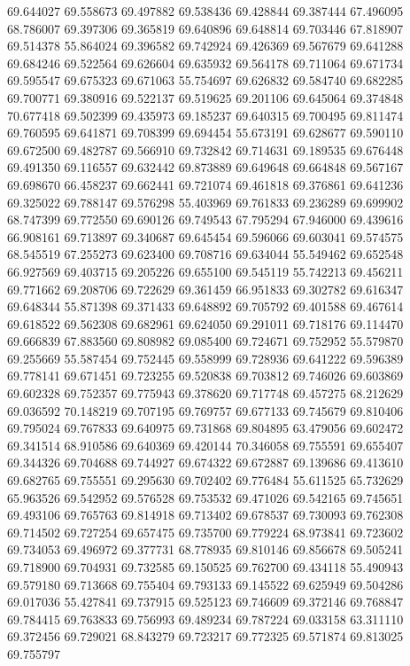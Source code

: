 69.644027
69.558673
69.497882
69.538436
69.428844
69.387444
67.496095
68.786007
69.397306
69.365819
69.640896
69.648814
69.703446
67.818907
69.514378
55.864024
69.396582
69.742924
69.426369
69.567679
69.641288
69.684246
69.522564
69.626604
69.635932
69.564178
69.711064
69.671734
69.595547
69.675323
69.671063
55.754697
69.626832
69.584740
69.682285
69.700771
69.380916
69.522137
69.519625
69.201106
69.645064
69.374848
70.677418
69.502399
69.435973
69.185237
69.640315
69.700495
69.811474
69.760595
69.641871
69.708399
69.694454
55.673191
69.628677
69.590110
69.672500
69.482787
69.566910
69.732842
69.714631
69.189535
69.676448
69.491350
69.116557
69.632442
69.873889
69.649648
69.664848
69.567167
69.698670
66.458237
69.662441
69.721074
69.461818
69.376861
69.641236
69.325022
69.788147
69.576298
55.403969
69.761833
69.236289
69.699902
68.747399
69.772550
69.690126
69.749543
67.795294
67.946000
69.439616
66.908161
69.713897
69.340687
69.645454
69.596066
69.603041
69.574575
68.545519
67.255273
69.623400
69.708716
69.634044
55.549462
69.652548
66.927569
69.403715
69.205226
69.655100
69.545119
55.742213
69.456211
69.771662
69.208706
69.722629
69.361459
66.951833
69.302782
69.616347
69.648344
55.871398
69.371433
69.648892
69.705792
69.401588
69.467614
69.618522
69.562308
69.682961
69.624050
69.291011
69.718176
69.114470
69.666839
67.883560
69.808982
69.085400
69.724671
69.752952
55.579870
69.255669
55.587454
69.752445
69.558999
69.728936
69.641222
69.596389
69.778141
69.671451
69.723255
69.520838
69.703812
69.746026
69.603869
69.602328
69.752357
69.775943
69.378620
69.717748
69.457275
68.212629
69.036592
70.148219
69.707195
69.769757
69.677133
69.745679
69.810406
69.795024
69.767833
69.640975
69.731868
69.804895
63.479056
69.602472
69.341514
68.910586
69.640369
69.420144
70.346058
69.755591
69.655407
69.344326
69.704688
69.744927
69.674322
69.672887
69.139686
69.413610
69.682765
69.755551
69.295630
69.702402
69.776484
55.611525
65.732629
65.963526
69.542952
69.576528
69.753532
69.471026
69.542165
69.745651
69.493106
69.765763
69.814918
69.713402
69.678537
69.730093
69.762308
69.714502
69.727254
69.657475
69.735700
69.779224
68.973841
69.723602
69.734053
69.496972
69.377731
68.778935
69.810146
69.856678
69.505241
69.718900
69.704931
69.732585
69.150525
69.762700
69.434118
55.490943
69.579180
69.713668
69.755404
69.793133
69.145522
69.625949
69.504286
69.017036
55.427841
69.737915
69.525123
69.746609
69.372146
69.768847
69.784415
69.763833
69.756993
69.489234
69.787224
69.033158
63.311110
69.372456
69.729021
68.843279
69.723217
69.772325
69.571874
69.813025
69.755797
